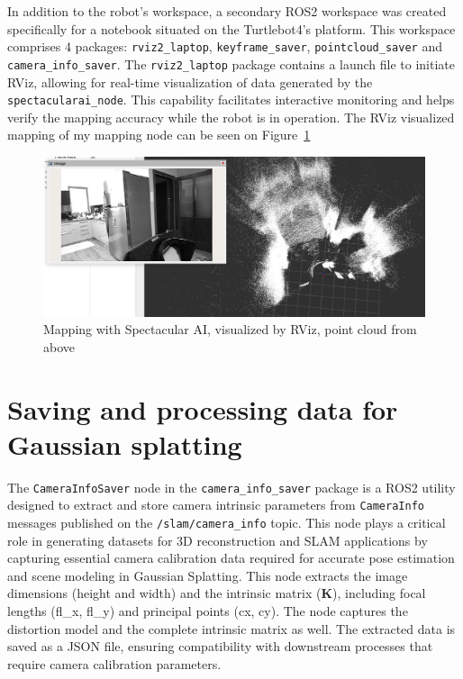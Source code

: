 In addition to the robot’s workspace, a secondary ROS2 workspace was created specifically for a notebook situated on the Turtlebot4’s platform. This workspace comprises 4 packages: \verb|rviz2_laptop|, \verb|keyframe_saver|, \verb|pointcloud_saver| and \verb|camera_info_saver|. The \verb|rviz2_laptop| package contains a launch file to initiate RViz, allowing for real-time visualization of data generated by the \verb|spectacularai_node|. This capability facilitates interactive monitoring and helps verify the mapping accuracy while the robot is in operation. The RViz visualized mapping of my mapping node can be seen on Figure~\ref{fig:spai_mapping_rviz}

\begin{figure}[htbp]
	\centering
	\includegraphics[width=150mm, keepaspectratio]{figures_jpg/spai_mapping_rviz.jpg}
	\caption{Mapping with Spectacular AI, visualized by RViz, point cloud from above}
	\label{fig:spai_mapping_rviz}
\end{figure}


\section{Saving and processing data for Gaussian splatting}

The \verb|CameraInfoSaver| node in the \verb|camera_info_saver| package is a ROS2 utility designed to extract and store camera intrinsic parameters from \verb|CameraInfo| messages published on the \verb|/slam/camera_info| topic. This node plays a critical role in generating datasets for 3D reconstruction and SLAM applications by capturing essential camera calibration data required for accurate pose estimation and scene modeling in Gaussian Splatting. This node extracts the image dimensions (height and width) and the intrinsic matrix (\textbf{K}), including focal lengths (fl\_x, fl\_y) and principal points (cx, cy). The node captures the distortion model and the complete intrinsic matrix as well. The extracted data is saved as a JSON file, ensuring compatibility with downstream processes that require camera calibration parameters.

